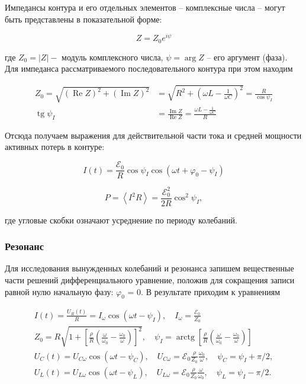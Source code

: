 \documentclass[a4paper, 12pt]{article}%
\begin{document}
Импедансы контура и его отдельных элементов -- комплексные числа -- могут быть представлены в показательной форме:

\[
Z=Z_{0} e^{i \psi}
\]

где $Z_{0}=|Z|-$ модуль комплексного числа, $\psi=\arg Z$ -- его аргумент (фаза). Для импеданса рассматриваемого последовательного контура при этом находим

\[
\begin{aligned}
Z_{0}=\sqrt{(\operatorname{Re} Z)^{2}+(\operatorname{Im} Z)^{2}} &=\sqrt{R^{2}+\left(\omega L-\frac{1}{\omega C}\right)^{2}}=\frac{R}{\cos \psi_{I}} \\
\operatorname{tg} \psi_{I} &=\frac{\operatorname{Im} Z}{\operatorname{Re} Z}=\frac{\omega L-\frac{1}{\omega C}}{R}
\end{aligned}
\]

Отсюда получаем выражения для действительной части тока и средней мощности активных потерь в контуре:

\[ I(t)=\frac{\mathcal{E}_{0}}{R} \cos \psi_{I} \cos \left(\omega t+\varphi_{0}-\psi_{I}\right) \]

\[ P=\left\langle I^{2} R\right\rangle=\frac{\mathcal{E}_{0}^{2}}{2 R} \cos ^{2} \psi_{I},\]

где угловые скобки означают усреднение по периоду колебаний.

\subsubsection{Резонанс}

Для исследования вынужденных колебаний и резонанса запишем вещественные части решений дифференциального уравнение, положив для сокраще­ния записи равной нулю начальную фазу: $\varphi_0$ = 0. В результате приходим к уравнениям

\[\begin{gathered}
I(t)=\frac{U_{R}(t)}{R}=I_{\omega} \cos \left(\omega t-\psi_{I}\right), \quad I_{\omega}=\frac{\mathcal{E}_{0}}{Z_{0}} \\
Z_{0}=R \sqrt{1+\left[\frac{\rho}{R}\left(\frac{\omega}{\omega_{0}}-\frac{\omega_{0}}{\omega}\right)\right]^{2}}, \quad \psi_{I}=\operatorname{arctg}\left[\frac{\rho}{R}\left(\frac{\omega}{\omega_{0}}-\frac{\omega_{0}}{\omega}\right)\right] \\
U_{C}(t)=U_{C \omega} \cos \left(\omega t-\psi_{C}\right), \quad U_{C \omega}=\mathcal{E}_{0} \frac{\rho}{Z_{0}} \frac{\omega_{0}}{\omega}, \quad \psi_{C}=\psi_{I}+\pi / 2, \\
U_{L}(t)=U_{L \omega} \cos \left(\omega t-\psi_{L}\right), \quad U_{L \omega}=\mathcal{E}_{0} \frac{\rho}{Z_{0}} \frac{\omega}{\omega_{0}}, \quad \psi_{L}=\psi_{I}-\pi / 2 .
\end{gathered}\]
\end{document}

